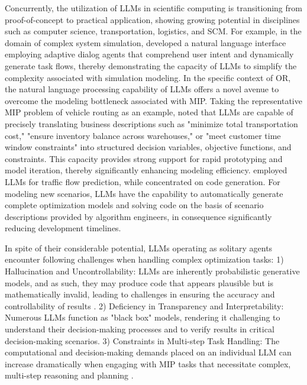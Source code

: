 \documentclass[preprint,12pt]{elsarticle}
\begin{document}
Concurrently, the utilization of LLMs in scientific computing is transitioning from proof-of-concept to practical application, showing growing potential in disciplines such as computer science, transportation, logistics, and SCM. For example, in the domain of complex system simulation, \cite{liAdaptiveTODLLMdrivenAdaptive2025a} developed a natural language interface employing adaptive dialog agents that comprehend user intent and dynamically generate task flows, thereby demonstrating the capacity of LLMs to simplify the complexity associated with simulation modeling. In the specific context of OR, the natural language processing capability of LLMs offers a novel avenue to overcome the modeling bottleneck associated with MIP. Taking the representative MIP problem of vehicle routing as an example, \cite{jiangDROCELEVATINGLARGE2025a} noted that LLMs are capable of precisely translating business descriptions such as "minimize total transportation cost," "ensure inventory balance across warehouses," or "meet customer time window constraints" into structured decision variables, objective functions, and constraints. This capacity provides strong support for rapid prototyping and model iteration, thereby significantly enhancing modeling efficiency. \cite{liuSTLLMGraphEnhanced2025} employed LLMs for traffic flow prediction, while \cite{ishibashiSelfOrganizedAgentsLLM2024} concentrated on code generation. For modeling new scenarios, LLMs have the capability to  automatically generate complete optimization models and solving code on the basis of  scenario descriptions provided by algorithm engineers, in consequence significantly reducing development timelines.

In spite of their considerable potential, LLMs operating as solitary agents encounter following challenges when handling complex optimization tasks:
1) Hallucination and Uncontrollability: LLMs are inherently probabilistic generative models, and as such, they may produce code that appears plausible but is mathematically invalid, leading to challenges in ensuring the accuracy and controllability of results \cite{huangSurveyHallucinationLarge2025}.
2) Deficiency in Transparency and Interpretability: Numerous LLMs function as "black box" models, rendering it challenging to understand their decision-making processes and to verify results in critical decision-making scenarios.
3) Constraints in Multi-step Task Handling: The computational and decision-making demands placed on an individual LLM can increase dramatically when engaging with MIP tasks that necessitate complex, multi-step reasoning and planning \cite{labanLLMsGetLost2025a}.
\end{document}
